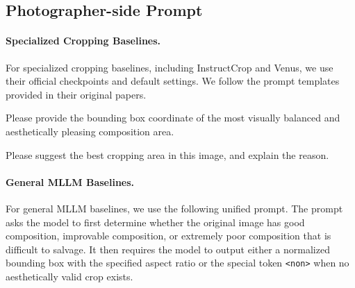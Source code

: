 \documentclass{llmxive}
\begin{document}
\subsection{Photographer-side Prompt}
\label{app:photographer_side_baseline_prompt}

\paragraph{Specialized Cropping Baselines.}
For specialized cropping baselines, including InstructCrop and Venus, we use their official checkpoints and default settings. We follow the prompt templates provided in their original papers.

\begin{promptbox}
\small
Please provide the bounding box coordinate of the most visually balanced and aesthetically pleasing composition area.
\end{promptbox}

\begin{promptbox}
\small
Please suggest the best cropping area in this image, and explain the reason.
\end{promptbox}

\paragraph{General MLLM Baselines.}
For general MLLM baselines, we use the following unified prompt. The prompt asks the model to first determine whether the original image has good composition, improvable composition, or extremely poor composition that is difficult to salvage. It then requires the model to output either a normalized bounding box with the specified aspect ratio or the special token \texttt{<non>} when no aesthetically valid crop exists.
\end{document}
